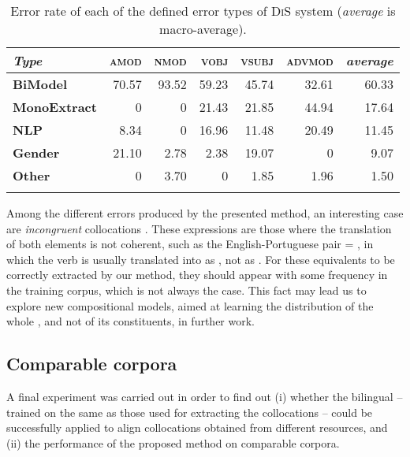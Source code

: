 \documentclass[output=paper,modfonts,nonflat]{langsci/langscibook}
\begin{document}
\begin{table}
  \begin{center}
    \caption{\label{tab:error} Error rate of each of the defined error types of \textsc{DiS} system (\emph{average} is macro-average).}
    \begin{tabular}{lrrrrrr}
      \lsptoprule
      \textbf{\emph{Type}}&\textbf{\textsc{amod}}&\textbf{\textsc{nmod}}&\textbf{\textsc{vobj}}&\textbf{\textsc{vsubj}}&\textbf{\textsc{advmod}}&\textbf{\emph{average}}\\
      \midrule
      \textbf{BiModel} & 70.57 & 93.52 & 59.23 & 45.74 & 32.61                 & 60.33\\
      \textbf{MonoExtract} & 0\phantom{00} & 0\phantom{00} & 21.43 & 21.85 & 44.94 & 17.64\\
      \textbf{NLP} & 8.34  & 0\phantom{00} & 16.96 & 11.48 & 20.49         & 11.45\\
      \textbf{Gender} & 21.10 & 2.78  & 2.38  & 19.07 & 0\phantom{00}         & 9.07\\
      \textbf{Other} & 0\phantom{00} & 3.70  & 0\phantom{00} & 1.85  & 1.96  & 1.50\\
      \lspbottomrule
    \end{tabular}
  \end{center}
\end{table}

Among the different errors produced by the presented method, an interesting case
are \emph{incongruent} collocations \citep{nesselhauf2003}. These expressions are
those where the translation of both elements is not coherent, such as the English-Portuguese pair  = , in which the verb  is usually translated into  as , not as .
For these  equivalents to be correctly extracted by our method, they should
appear with some frequency in the training corpus, which is not always the case. This fact
may lead us to explore new compositional models, aimed at learning the distribution of the
whole , and not of its constituents, in further work.

\subsection{Comparable corpora}
A final experiment was carried out in order to find out (i) whether the bilingual
 -- trained on the same  as those used for
extracting the collocations -- could be successfully applied to align collocations
obtained from different resources, and (ii) the performance of the proposed
method on comparable corpora.
\end{document}
